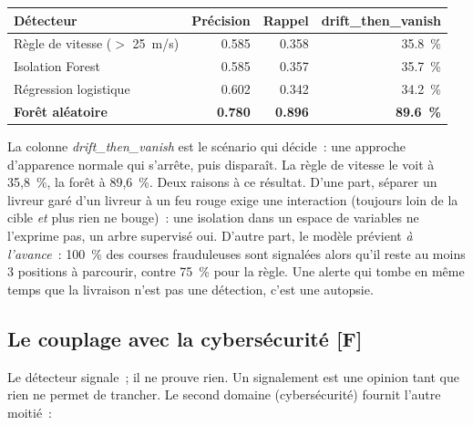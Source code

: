 \documentclass[11pt,a4paper]{article}
\begin{document}
\begin{center}
\begin{tabular}{|l|r|r|r|}
\hline
\textbf{D\'etecteur} & \textbf{Pr\'ecision} & \textbf{Rappel} & \textbf{drift\_then\_vanish} \\
\hline
R\`egle de vitesse ($>$ 25~m/s) & 0.585 & 0.358 & 35.8~\% \\
Isolation Forest              & 0.585 & 0.357 & 35.7~\% \\
R\'egression logistique       & 0.602 & 0.342 & 34.2~\% \\
\textbf{For\^et al\'eatoire}  & \textbf{0.780} & \textbf{0.896} & \textbf{89.6~\%} \\
\hline
\end{tabular}
\end{center}

\noindent
La colonne \emph{drift\_then\_vanish} est le sc\'enario qui d\'ecide~: une approche d'apparence normale qui s'arr\^ete, puis dispara\^it. La r\`egle de vitesse le voit \`a 35,8~\%, la for\^et \`a 89,6~\%. Deux raisons \`a ce r\'esultat. D'une part, s\'eparer un livreur gar\'e d'un livreur \`a un feu rouge exige une interaction (\og{}toujours loin de la cible \emph{et} plus rien ne bouge\fg{})~: une isolation dans un espace de variables ne l'exprime pas, un arbre supervis\'e oui. D'autre part, le mod\`ele pr\'evient \emph{\`a l'avance}~: 100~\% des courses frauduleuses sont signal\'ees alors qu'il reste au moins 3 positions \`a parcourir, contre 75~\% pour la r\`egle. Une alerte qui tombe en m\^eme temps que la livraison n'est pas une d\'etection, c'est une autopsie.

\subsection{Le couplage avec la cybers\'ecurit\'e \textbf{[F]}}
Le d\'etecteur signale~; il ne prouve rien. Un signalement est une opinion tant que rien ne permet de trancher. Le second domaine (cybers\'ecurit\'e) fournit l'autre moiti\'e~:
\end{document}
